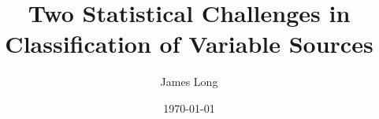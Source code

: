 \documentclass[12pt]{beamer}
\title{Two Statistical Challenges in Classification of Variable Sources}
\author{James Long}
\institute{Texas A\&M University}
\date{\today}
\newcommand{\w}{1in}
\newcommand{\h}{1in}
\begin{document}
\frame{\titlepage}



  




\end{document}
